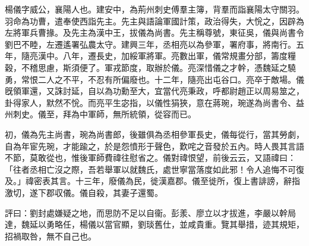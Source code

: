 \begin{pinyinscope}
 
 
 楊儀字威公，襄陽人也。建安中，為荊州刺史傅羣主簿，背羣而詣襄陽太守關羽。羽命為功曹，遣奉使西詣先主。先主與語論軍國計策，政治得失，大恱之，因辟為左將軍兵曹掾。及先主為漢中王，拔儀為尚書。先主稱尊號，東征吳，儀與尚書令劉巴不睦，左遷遙署弘農太守。建興三年，丞相亮以為參軍，署府事，將南行。五年，隨亮漢中。八年，遷長史，加綏軍將軍。亮數出軍，儀常規畫分部，籌度糧穀，不稽思慮，斯須便了。軍戎節度，取辦於儀。亮深惜儀之才幹，憑魏延之驍勇，常恨二人之不平，不忍有所偏廢也。十二年，隨亮出屯谷口。亮卒于敵場。儀旣領軍還，又誅討延，自以為功勳至大，宜當代亮秉政，呼都尉趙正以周易筮之，卦得家人，默然不恱。而亮平生宓指，以儀性狷狹，意在蔣琬，琬遂為尚書令、益州刺史。儀至，拜為中軍師，無所統領，從容而已。
 
 
 
 
 初，儀為先主尚書，琬為尚書郎，後雖俱為丞相參軍長史，儀每從行，當其勞劇，自為年宦先琬，才能踰之，於是怨憤形于聲色，歎咤之音發於五內。時人畏其言語不節，莫敢從也，惟後軍師費禕往慰省之。儀對禕恨望，前後云云，又語禕曰：「往者丞相亡沒之際，吾若舉軍以就魏氏，處世寧當落度如此邪！令人追悔不可復及。」禕密表其言。十三年，廢儀為民，徙漢嘉郡。儀至徙所，復上書誹謗，辭指激切，遂下郡収儀。儀自殺，其妻子還蜀。
 
 
 
 
 
 
 評曰：劉封處嫌疑之地，而思防不足以自衞。彭羕、廖立以才拔進，李嚴以幹局達，魏延以勇略任，楊儀以當官顯，劉琰舊仕，並咸貴重。覽其舉措，迹其規矩，招禍取咎，無不自己也。
 
 
\end{pinyinscope}